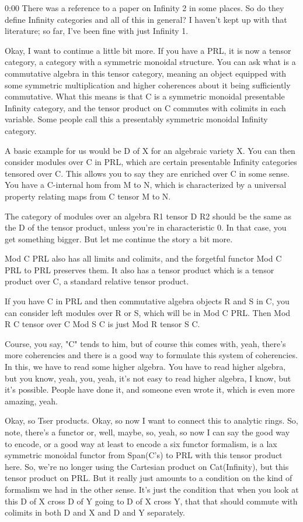 \begin{unfinished}{0:00}
There was a reference to a paper on Infinity 2 in some places. So do they define Infinity categories and all of this in general? I haven't kept up with that literature; so far, I've been fine with just Infinity 1.

Okay, I want to continue a little bit more. If you have a PRL, it is now a tensor category, a category with a symmetric monoidal structure. You can ask what is a commutative algebra in this tensor category, meaning an object equipped with some symmetric multiplication and higher coherences about it being sufficiently commutative. What this means is that C is a symmetric monoidal presentable Infinity category, and the tensor product on C commutes with colimits in each variable. Some people call this a presentably symmetric monoidal Infinity category.

A basic example for us would be D of X for an algebraic variety X. You can then consider modules over C in PRL, which are certain presentable Infinity categories tensored over C. This allows you to say they are enriched over C in some sense. You have a C-internal hom from M to N, which is characterized by a universal property relating maps from C tensor M to N.

The category of modules over an algebra R1 tensor D R2 should be the same as the D of the tensor product, unless you're in characteristic 0. In that case, you get something bigger. But let me continue the story a bit more.

Mod C PRL also has all limits and colimits, and the forgetful functor Mod C PRL to PRL preserves them. It also has a tensor product which is a tensor product over C, a standard relative tensor product. 

If you have C in PRL and then commutative algebra objects R and S in C, you can consider left modules over R or S, which will be in Mod C PRL. Then Mod R C tensor over C Mod S C is just Mod R tensor S C.

Course, you say, "C" tends to him, but of course this comes with, yeah, there's more coherencies and there is a good way to formulate this system of coherencies. In this, we have to read some higher algebra. You have to read higher algebra, but you know, yeah, you, yeah, it's not easy to read higher algebra, I know, but it's possible. People have done it, and someone even wrote it, which is even more amazing, yeah.

Okay, so Tser products. Okay, so now I want to connect this to analytic rings. So, note, there's a functor or, well, maybe, so, yeah, so now I can say the good way to encode, or a good way at least to encode a six functor formalism, is a lax symmetric monoidal functor from Span(C's) to PRL with this tensor product here. So, we're no longer using the Cartesian product on Cat(Infinity), but this tensor product on PRL. But it really just amounts to a condition on the kind of formalism we had in the other sense. It's just the condition that when you look at this D of X cross D of Y going to D of X cross Y, that that should commute with colimits in both D and X and D and Y separately.


\end{unfinished}
